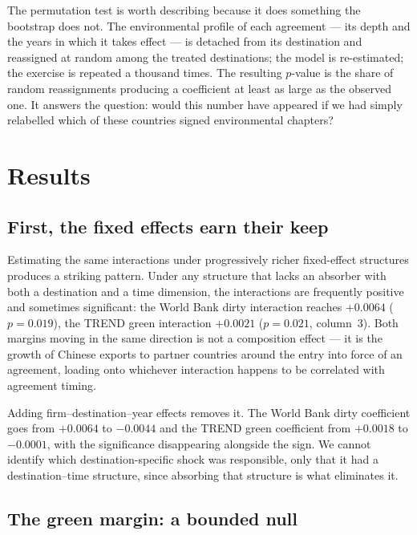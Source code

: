 \documentclass[11pt]{article}
\begin{document}
The permutation test is worth describing because it does something the bootstrap does not. The
environmental profile of each agreement --- its depth and the years in which it takes effect --- is
detached from its destination and reassigned at random among the treated destinations; the model is
re-estimated; the exercise is repeated a thousand times. The resulting $p$-value is the share of
random reassignments producing a coefficient at least as large as the observed one. It answers the
question: would this number have appeared if we had simply relabelled which of these countries signed
environmental chapters?

\section{Results}

\subsection*{First, the fixed effects earn their keep}

Estimating the same interactions under progressively richer fixed-effect structures produces a
striking pattern. Under any structure that lacks an absorber with both a destination and a time
dimension, the interactions are frequently positive and sometimes significant: the World Bank dirty
interaction reaches $+0.0064$ ($p = 0.019$), the TREND green interaction $+0.0021$ ($p = 0.021$,
column~3).
Both margins moving in the same direction is not a composition effect --- it is the growth of Chinese
exports to partner countries around the entry into force of an agreement, loading onto whichever
interaction happens to be correlated with agreement timing.

Adding firm--destination--year effects removes it. The World Bank dirty coefficient goes from
$+0.0064$ to $-0.0044$ and the TREND green coefficient from $+0.0018$ to $-0.0001$, with the
significance disappearing alongside the sign. We cannot identify which destination-specific shock was
responsible, only that it had a destination--time structure, since absorbing that structure is what
eliminates it.

\subsection*{The green margin: a bounded null}
\end{document}
